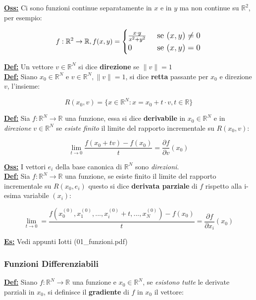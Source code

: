\documentclass[a4paper,12pt]{article}
\newcommand{\definizione}{\noindent\textbf{\underline{Def:}} }
\newcommand{\osservazione}{\noindent\textbf{\underline{Oss:}} }
\newcommand{\esempio}{\noindent\textbf{\underline{Es:}} }
\begin{document}
	\noindent \textbf{\underline{Oss:} } Ci sono funzioni continue separatamente in $x$ e in $y$ ma non continue su $\mathbb{R}^2$, per esempio:

	\[
	f : \mathbb{R}^2 \rightarrow \mathbb{R}, f(x,y) =
	\begin{large}
		\begin{cases}
			\frac{x \cdot y}{x^2 + y^2} & \text{ se } (x,y) \neq 0 \\
			0 & \text{ se } (x,y) = 0
		\end{cases}
	\end{large}
	\]

	\definizione Un vettore $v \in \mathbb{R}^N$ si dice \textbf{direzione} se $\| v \| = 1 $ \\

	\definizione Siano $x_0 \in \mathbb{R}^N$ e $ v \in \mathbb{R}^N, \| v \| = 1$, si dice \textbf{retta} passante per $x_0$ e direzione $v$, l'insieme:

	\[
	R(x_0,v) = \{ x \in \mathbb{R}^N : x = x_0 + t \cdot v, t \in \mathbb{R}\}
	\]

	\definizione Sia $f : \mathbb{R}^N \rightarrow \mathbb{R}$ una funzione, essa si dice \textbf{derivabile} in $x_0 \in \mathbb{R}^N$ e in \textit{direzione} $v \in \mathbb{R}^N$ se \textit{esiste finito} il limite del rapporto incrementale su $R(x_0,v)$:

	\[
	\lim_{t \rightarrow 0} \frac{f(x_0 + tv) - f(x_0)}{t} = \frac{\partial f}{\partial v} (x_0)
	\]

	\osservazione I vettori $e_i$ della base canonica di $\mathbb{R}^N$ sono \textit{direzioni}. \\

	\definizione Sia $f : \mathbb{R}^N \rightarrow \mathbb{R}$ una funzione, se esiste finito il limite del rapporto incrementale su $R(x_0, e_i)$ questo si dice \textbf{derivata parziale} di $f$ rispetto alla i-esima variabile $(x_i)$:

	\[
	\lim_{t \rightarrow 0} = \frac{f(x_0^{(0)}, x_1^{(0)}, ..., x_i^{(0)} + t, ..., x_N^{(0)}) - f(x_0)}{t} = \frac{\partial f}{\partial x_i} (x_0)
	\]

	\esempio Vedi appunti Iotti (01\_funzioni.pdf) \\

	\subsubsection{Funzioni Differenziabili}

	\definizione Siano $f : \mathbb{R}^N \rightarrow \mathbb{R}$ una funzione e $x_0 \in \mathbb{R}^N$, se \textit{esistono tutte} le derivate parziali in $x_0$, si definisce il \textbf{gradiente} di $f$ in $x_0$ il vettore:
\end{document}
